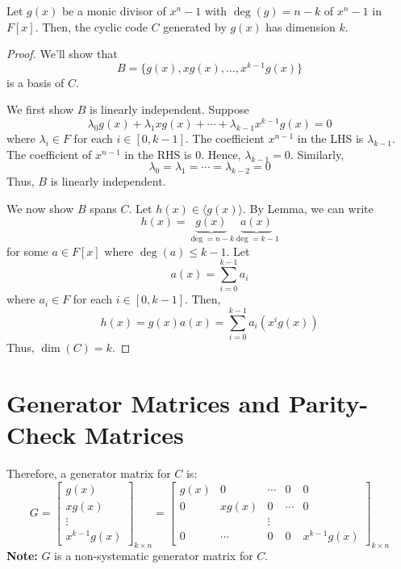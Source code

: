 \begin{thmbox}
    \begin{theorem}
        Let $ g(x) $ be a monic divisor of $ x^n-1 $ with $ \deg(g)=n-k $ of
        $ x^n-1 $ in $ F[x] $. Then, the cyclic code $ C $ generated
        by $ g(x) $ has dimension $ k $.
    \end{theorem}
\end{thmbox}

\begin{proof}
    We'll show that
    \[ B=\{g(x),xg(x),\ldots ,x^{k-1}g(x)\} \]
    is a basis of $ C $.

    We first show $ B $ is linearly independent. Suppose
    \[ \lambda_0g(x)+\lambda_1xg(x)+\cdots+\lambda_{k-1}x^{k-1}g(x)=0 \]
    where $ \lambda_i\in F $ for each $ i\in[0,k-1] $.
    The coefficient $ x^{n-1} $ in the LHS
    is $ \lambda_{k-1} $. The coefficient of $ x^{n-1} $ in the RHS is $ 0 $.
    Hence, $ \lambda_{k-1}=0 $. Similarly,
    \[ \lambda_0=\lambda_1=\cdots=\lambda_{k-2}=0 \]
    Thus, $ B $ is linearly independent.

    We now show $ B $ spans $ C $. Let $ h(x)\in \langle g(x)\rangle $.
    By Lemma, we can write
    \[ h(x)=\underbrace{g(x)}_{\deg = n-k}\underbrace{a(x)}_{\deg = k-1} \]
    for some $ a\in F[x] $ where $ \deg(a)\leqslant k-1 $. Let
    \[ a(x)=\sum\limits_{i=0}^{k-1} a_i \]
    where $ a_i\in F $ for each $ i\in[0,k-1] $. Then,
    \[ h(x)=g(x)a(x)=\sum\limits_{i=0}^{k-1} a_i(x^i g(x)) \]
    Thus, $ \dim(C)=k $.
\end{proof}

\section{Generator Matrices and Parity-Check Matrices}

Therefore, a generator matrix for $ C $ is:
\[ G
    =
    \begin{bmatrix}
        g(x)   \\
        xg(x)  \\
        \vdots \\
        x^{k-1}g(x)
    \end{bmatrix}_{k\times n}
    =
    \begin{bmatrix}
        g(x) & 0      & \cdots & 0      & 0           \\
        0    & xg(x)  & 0      & \cdots & 0           \\
             &        & \vdots                        \\
        0    & \cdots & 0      & 0      & x^{k-1}g(x)
    \end{bmatrix}_{k\times n}
\]
\textbf{Note:} $ G $ is a non-systematic generator matrix for $ C $.

